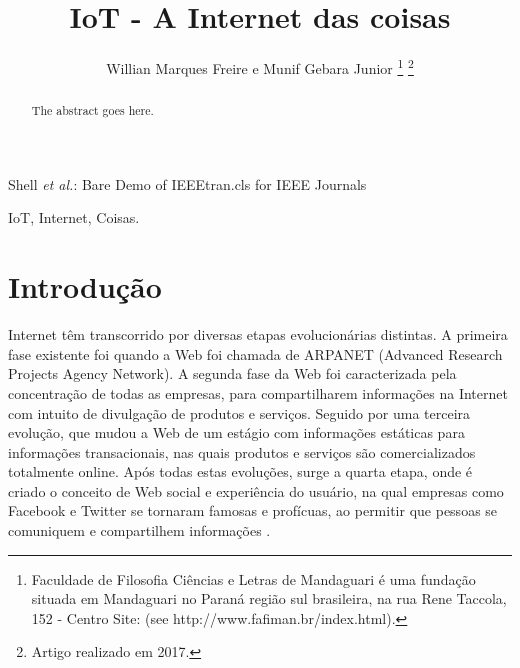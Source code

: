 \documentclass[journal]{IEEEtran}
\begin{document}
\title{IoT - A Internet das coisas}


\author{Willian Marques Freire e
        Munif Gebara Junior%
\thanks{Faculdade de Filosofia Ciências e Letras de Mandaguari é uma fundação
situada em Mandaguari no Paraná região sul brasileira,
na rua Rene Taccola, 152 - Centro Site: (see http://www.fafiman.br/index.html).}%
\thanks{Artigo realizado em 2017.}}



%
{Shell \MakeLowercase{\textit{et al.}}: Bare Demo of IEEEtran.cls for IEEE Journals}

\maketitle

\begin{abstract}
The abstract goes here.
\end{abstract}

\begin{IEEEkeywords}
IoT, Internet, Coisas.
\end{IEEEkeywords}




\IEEEpeerreviewmaketitle



\section{Introdução}

 Internet têm transcorrido por diversas etapas evolucionárias distintas. A primeira fase existente foi quando a Web foi chamada de ARPANET (Advanced Research Projects Agency Network). A segunda fase da Web foi caracterizada pela concentração de todas as empresas, para compartilharem informações na Internet com intuito de divulgação de produtos e serviços. Seguido por uma terceira evolução, que mudou a Web de um estágio com informações estáticas para informações transacionais, nas quais produtos e serviços são comercializados totalmente online. Após todas estas evoluções, surge a quarta etapa, onde é criado o conceito de Web social e experiência do usuário, na qual empresas como Facebook e Twitter se tornaram famosas e profícuas, ao permitir que pessoas se comuniquem e compartilhem informações \cite[p.~6]{Evans}.
\end{document}
